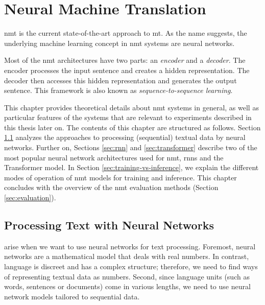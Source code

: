 \chapter{Neural Machine Translation}
\label{chap:nmt}

\gls{nmt} is the current state-of-the-art approach to \gls{mt}. As the name
suggests, the underlying machine learning concept in \gls{nmt} systems are
neural networks.

  Most of the \gls{nmt} architectures have
two parts: an \emph{encoder} and a \emph{decoder}. The encoder processes the
input sentence and creates a hidden representation. The decoder then accesses
this hidden representation and generates the output sentence. This framework is
also known as \emph{sequence-to-sequence learning}.

 This chapter provides theoretical details about
\gls{nmt} systems in general, as well as particular features of the systems that
are relevant to experiments described in this thesis later on. The contents of
this chapter are structured as follows. Section \ref{sec:text-processing}
analyzes the approaches to processing (sequential) textual data by neural
networks. Further on, Sections \ref{sec:rnn} and \ref{sec:transformer} describe
two of the most popular neural network architectures used for \gls{nmt},
\glspl{rnn} and the Transformer model.  In Section
\ref{sec:training-vs-inference}, we explain the different modes of operation of
\gls{nmt} models for training and inference. This chapter concludes with the
overview of the \gls{nmt} evaluation methods (Section \ref{sec:evaluation}).


\section{Processing Text with Neural Networks}
\label{sec:text-processing}

arise when we want to use neural networks for text processing. Foremost, neural
networks are a mathematical model that deals with real numbers. In contrast,
language is discreet and has a complex structure; therefore, we need to find
ways of representing textual data as numbers. Second, since language units (such
as words, sentences or documents) come in various lengths, we need to use neural
network models tailored to sequential data.

